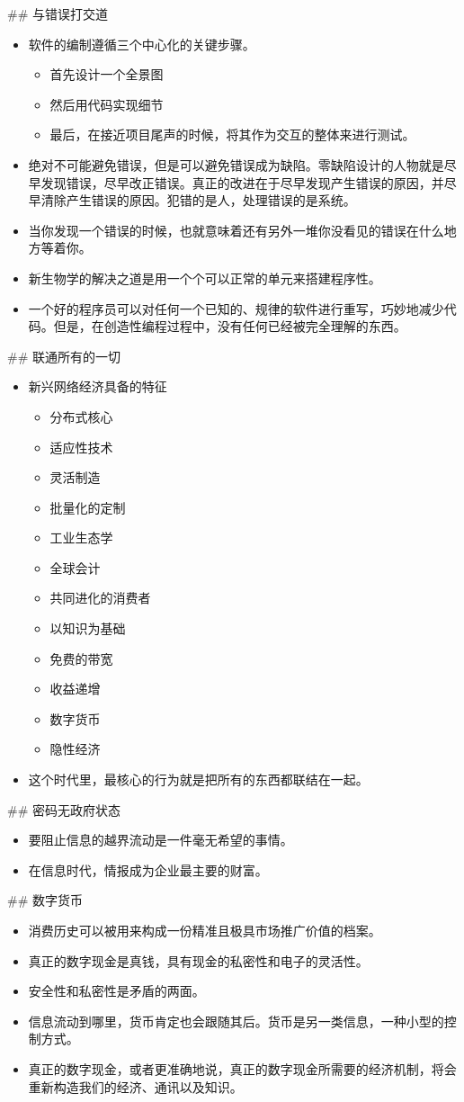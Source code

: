 \documentclass[11pt]{article}
\begin{document}
\#\# 与错误打交道
\begin{itemize}
\item 软件的编制遵循三个中心化的关键步骤。
\begin{itemize}
\item 首先设计一个全景图
\item 然后用代码实现细节
\item 最后，在接近项目尾声的时候，将其作为交互的整体来进行测试。
\end{itemize}
\item 绝对不可能避免错误，但是可以避免错误成为缺陷。零缺陷设计的人物就是尽早发现错误，尽早改正错误。真正的改进在于尽早发现产生错误的原因，并尽早清除产生错误的原因。犯错的是人，处理错误的是系统。
\item 当你发现一个错误的时候，也就意味着还有另外一堆你没看见的错误在什么地方等着你。
\item 新生物学的解决之道是用一个个可以正常的单元来搭建程序性。
\item 一个好的程序员可以对任何一个已知的、规律的软件进行重写，巧妙地减少代码。但是，在创造性编程过程中，没有任何已经被完全理解的东西。
\end{itemize}

\#\# 联通所有的一切

\begin{itemize}
\item 新兴网络经济具备的特征
\begin{itemize}
\item 分布式核心
\item 适应性技术
\item 灵活制造
\item 批量化的定制
\item 工业生态学
\item 全球会计
\item 共同进化的消费者
\item 以知识为基础
\item 免费的带宽
\item 收益递增
\item 数字货币
\item 隐性经济
\end{itemize}
\item 这个时代里，最核心的行为就是把所有的东西都联结在一起。
\end{itemize}

\#\# 密码无政府状态 

\begin{itemize}
\item 要阻止信息的越界流动是一件毫无希望的事情。
\item 在信息时代，情报成为企业最主要的财富。
\end{itemize}

\#\# 数字货币

\begin{itemize}
\item 消费历史可以被用来构成一份精准且极具市场推广价值的档案。
\item 真正的数字现金是真钱，具有现金的私密性和电子的灵活性。
\item 安全性和私密性是矛盾的两面。
\item 信息流动到哪里，货币肯定也会跟随其后。货币是另一类信息，一种小型的控制方式。
\item 真正的数字现金，或者更准确地说，真正的数字现金所需要的经济机制，将会重新构造我们的经济、通讯以及知识。
\end{itemize}
\end{document}
